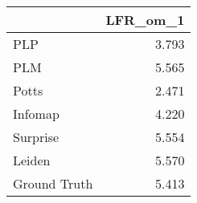 \begin{tabular}{lr}
\toprule
{} & LFR_om_1 \\
\midrule
PLP          &    3.793 \\
PLM          &    5.565 \\
Potts        &    2.471 \\
Infomap      &    4.220 \\
Surprise     &    5.554 \\
Leiden       &    5.570 \\
Ground Truth &    5.413 \\
\bottomrule
\end{tabular}
